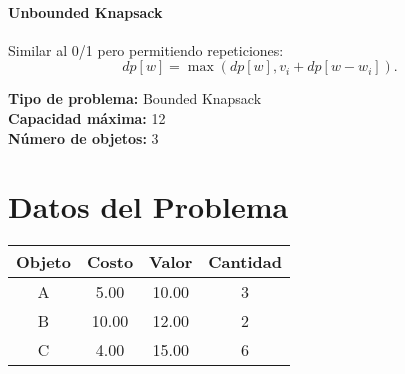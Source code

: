 \documentclass{article}
\begin{document}
\paragraph{Unbounded Knapsack} Similar al 0/1 pero permitiendo repeticiones:
\[
dp[w] = \max ( dp[w], v_i + dp[w - w_i] ).
\]

\thispagestyle{empty}
\newpage
\textbf{Tipo de problema:} Bounded Knapsack\\
\textbf{Capacidad máxima:} 12\\
\textbf{Número de objetos:} 3\\

\section*{Datos del Problema}
\begin{tabular}{|c|c|c|c|}
\hline
Objeto & Costo & Valor & Cantidad \\
\hline
A & 5.00 & 10.00 & 3 \\
B & 10.00 & 12.00 & 2 \\
C & 4.00 & 15.00 & 6 \\
\hline
\end{tabular}
\end{document}
